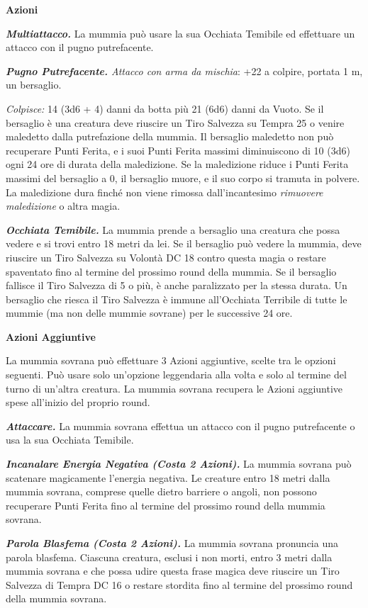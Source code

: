 \begin{multicols}{2}
	\textbf{Azioni}

	\textit{\textbf{Multiattacco.}} La mummia può usare la sua Occhiata Temibile ed effettuare un attacco con il pugno putrefacente.

	\textit{\textbf{Pugno Putrefacente.} Attacco con arma da mischia}: +22 a colpire, portata 1 m, un bersaglio.

	\textit{Colpisce:} 14 (3d6 + 4) danni da botta più 21 (6d6) danni da Vuoto. Se il bersaglio è una creatura deve riuscire un Tiro Salvezza su Tempra 25 o venire maledetto dalla putrefazione della mummia. Il bersaglio maledetto non può recuperare Punti Ferita, e i suoi Punti Ferita massimi diminuiscono di 10 (3d6) ogni 24 ore di durata della maledizione. Se la maledizione riduce i Punti Ferita massimi del bersaglio a 0, il bersaglio muore, e il suo corpo si tramuta in polvere. La maledizione dura finché non viene rimossa dall'incantesimo \textit{rimuovere maledizione} o altra magia.

	\textit{\textbf{Occhiata Temibile.}} La mummia prende a bersaglio una creatura che possa vedere e si trovi entro 18 metri da lei. Se il bersaglio può vedere la mummia, deve riuscire un Tiro Salvezza su Volontà DC 18 contro questa magia o restare spaventato fino al termine del prossimo round della mummia. Se il bersaglio fallisce il Tiro Salvezza di 5 o più, è anche paralizzato per la stessa durata. Un bersaglio che riesca il Tiro Salvezza è immune all'Occhiata Terribile di tutte le mummie (ma non delle mummie sovrane) per le successive 24 ore.

	\textbf{Azioni Aggiuntive}

	La mummia sovrana può effettuare 3 Azioni aggiuntive, scelte tra le opzioni seguenti. Può usare solo un'opzione leggendaria alla volta e solo al termine del turno di un'altra creatura. La mummia sovrana recupera le Azioni aggiuntive spese all'inizio del proprio round.

	\textit{\textbf{Attaccare.}} La mummia sovrana effettua un attacco con il pugno putrefacente o usa la sua Occhiata Temibile.

	\textit{\textbf{Incanalare Energia Negativa (Costa 2 Azioni).}} La mummia sovrana può scatenare magicamente l'energia negativa. Le creature entro 18 metri dalla mummia sovrana, comprese quelle dietro barriere o angoli, non possono recuperare Punti Ferita fino al termine del prossimo round della mummia sovrana.

	\textit{\textbf{Parola Blasfema (Costa 2 Azioni).}} La mummia sovrana pronuncia una parola blasfema. Ciascuna creatura, esclusi i non morti, entro 3 metri dalla mummia sovrana e che possa udire questa frase magica deve riuscire un Tiro Salvezza di Tempra DC 16 o restare stordita fino al termine del prossimo round della mummia sovrana.


\end{multicols}

